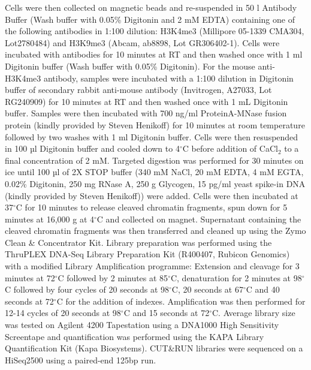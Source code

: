 Cells were then collected on magnetic beads and re-suspended in 50 \textmu{}l Antibody Buffer (Wash buffer with 0.05\% Digitonin and 2 mM EDTA) containing one of the following antibodies in 1:100 dilution: H3K4me3 (Millipore 05-1339 CMA304, Lot2780484) and H3K9me3 (Abcam, ab8898, Lot GR306402-1). Cells were incubated with antibodies for 10 minutes at RT and then washed once with 1 ml Digitonin buffer (Wash buffer with 0.05\% Digitonin). For the mouse anti-H3K4me3 antibody, samples were incubated with a 1:100 dilution in Digitonin buffer of secondary rabbit anti-mouse antibody (Invitrogen, A27033, Lot RG240909) for 10 minutes at RT and then washed once with 1 mL Digitonin buffer. Samples were then incubated with 700 ng/ml ProteinA-MNase fusion protein (kindly provided by Steven Henikoff) for 10 minutes at room temperature followed by two washes with 1 ml Digitonin buffer. Cells were then resuspended in 100 µl Digitonin buffer and cooled down to 4$^\circ$C before addition of CaCl$_2$ to a final concentration of 2 mM. Targeted digestion was performed for 30 minutes on ice until 100 µl of 2X STOP buffer (340 mM NaCl, 20 mM EDTA, 4 mM EGTA, 0.02\% Digitonin, 250 mg RNase A, 250 \textmu{}g Glycogen, 15 pg/ml yeast spike-in DNA (kindly provided by Steven Henikoff)) were added. Cells were then incubated at 37$^\circ$C for 10 minutes to release cleaved chromatin fragments, spun down for 5 minutes at 16,000 g at 4$^\circ$C and collected on magnet. Supernatant containing the cleaved chromatin fragments was then transferred and cleaned up using the Zymo Clean \& Concentrator Kit.
Library preparation was performed using the ThruPLEX\textsuperscript{\textregistered} DNA-Seq Library Preparation Kit (R400407, Rubicon Genomics) with a modified Library Amplification programme: Extension and cleavage for 3 minutes at 72$^\circ$C followed by 2 minutes at 85$^\circ$C, denaturation for 2 minutes at 98$^\circ$C followed by four cycles of 20 seconds at 98$^\circ$C, 20 seconds at 67$^\circ$C and 40 seconds at 72$^\circ$C for the addition of indexes. Amplification was then performed for 12-14 cycles of 20 seconds at 98$^\circ$C and 15 seconds at 72$^\circ$C. Average library size was tested on Agilent 4200 Tapestation using a DNA1000 High Sensitivity Screentape and quantification was performed using the KAPA Library Quantification Kit (Kapa Biosystems). CUT\&{}RUN libraries were sequenced on a HiSeq2500 using a paired-end 125bp run. 

